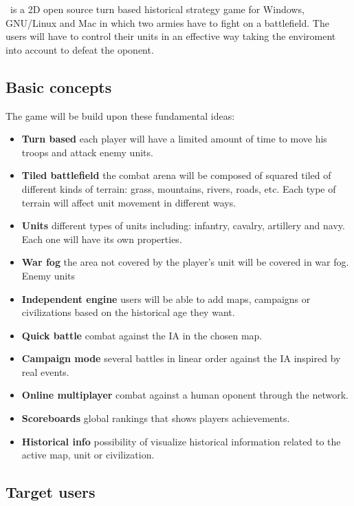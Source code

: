 
\game\ is a 2D open source turn based historical strategy game for
Windows, GNU/Linux and Mac in which two armies have to fight on a
battlefield. The users will have to control their units in an effective
way taking the enviroment into account to defeat the oponent.\\

\subsection{Basic concepts}

The game will be build upon these fundamental ideas:

\begin{itemize}
    \item \textbf{Turn based} each player will have a limited amount of time to
    move his troops and attack enemy units.
    \item \textbf{Tiled battlefield} the combat arena will be composed of squared
    tiled of different kinds of terrain: grass, mountains, rivers, roads,
    etc. Each type of terrain will affect unit movement in different ways.
    \item \textbf{Units} different types of units including: infantry, cavalry,
    artillery and navy. Each one will have its own properties.
    \item \textbf{War fog} the area not covered by the player's unit will be covered
    in war fog. Enemy units 
    \item \textbf{Independent engine} users will be able to add maps, campaigns
    or civilizations based on the historical age they want.
    \item \textbf{Quick battle} combat against the IA in the chosen map.
    \item \textbf{Campaign mode} several battles in linear order against the IA
    inspired by real events.
    \item \textbf{Online multiplayer} combat against a human oponent through the
    network.
    \item \textbf{Scoreboards} global rankings that shows players achievements.
    \item \textbf{Historical info} possibility of visualize historical information
    related to the active map, unit or civilization.
\end{itemize}

\subsection{Target users}

